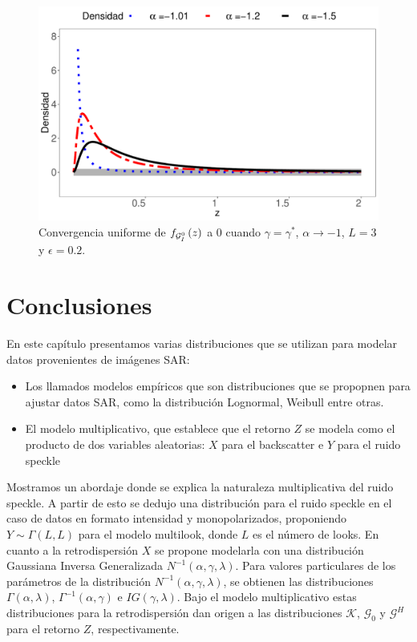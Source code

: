 \begin{figure}[hbt]
	\centering    
	\includegraphics[width=0.8\linewidth]{../../Figures/Tesis/Capitulo4/ConvUnifEnCero.pdf}
	\caption{\label{ConvEnCero}Convergencia uniforme de $f_{\mathcal{G}_I^0}\left( z \right)$ a $0$ cuando $\gamma=\gamma^*$, $\alpha \to -1$, $L=3$ y $\epsilon=0.2$.}
\end{figure}

\section{Conclusiones}

En este capítulo presentamos varias distribuciones que se utilizan para modelar datos provenientes de imágenes SAR:
\begin{itemize}
	\item Los llamados modelos empíricos que son distribuciones que se propopnen para ajustar datos SAR, como la distribución Lognormal, Weibull entre otras.
	\item El modelo multiplicativo, que establece que el retorno $Z$ se modela como el producto de dos variables aleatorias: $X$ para el backscatter e $Y$ para el ruido speckle
\end{itemize} 

Mostramos un abordaje donde se explica la naturaleza multiplicativa del ruido speckle. A partir de esto se dedujo una distribución para el ruido speckle en el caso de datos en formato intensidad y monopolarizados, proponiendo $Y\sim \Gamma(L,L)$ para el modelo multilook, donde $L$ es el número de looks. En cuanto a la retrodispersión $X$ se propone modelarla con una distribución Gaussiana Inversa Generalizada $N^{-1}(\alpha,\gamma,\lambda)$. Para valores particulares de los parámetros de la distribución $N^{-1}(\alpha,\gamma,\lambda)$, se obtienen las distribuciones $\Gamma(\alpha,\lambda)$, $\Gamma^{-1}(\alpha,\gamma)$ e $IG(\gamma, \lambda)$. Bajo el modelo multiplicativo estas distribuciones para la retrodispersión dan origen a las distribuciones $\mathcal{K}$, $\mathcal{G}_0$ y $\mathcal{G}^H$ para el retorno $Z$, respectivamente. 

